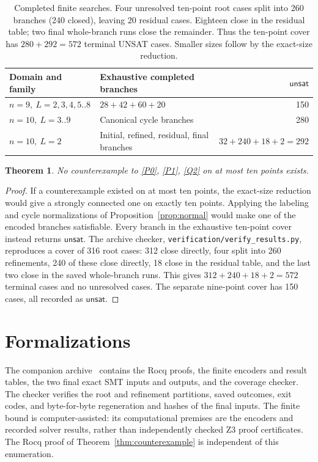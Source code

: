 \documentclass[11pt]{amsart}
\newcommand{\unsat}{\mathsf{unsat}}
\newtheorem{theorem}{Theorem}
\begin{document}
\begin{table}[t]
\centering
\small
\setlength{\tabcolsep}{4pt}
\begin{tabular}{@{}llr@{}}
\toprule
Domain and family & Exhaustive completed branches & \(\unsat\)\\
\midrule
\(n=9,\ L=2,3,4,5..8\) & \(28+42+60+20\) & 150\\
\(n=10,\ L=3..9\) & Canonical cycle branches & 280\\
\(n=10,\ L=2\) & Initial, refined, residual, final branches & \(32+240+18+2=292\)\\
\bottomrule
\end{tabular}
\caption{Completed finite searches. Four unresolved ten-point root cases split into 260 branches (240 closed), leaving 20 residual cases. Eighteen close in the residual table; two final whole-branch runs close the remainder. Thus the ten-point cover has \(280+292=572\) terminal UNSAT cases. Smaller sizes follow by the exact-size reduction.}
\label{tab:runs}
\end{table}

\begin{theorem}\label{thm:finite}
No counterexample to \eqref{P0}, \eqref{P1}, \eqref{Q2} on at most ten points exists.
\end{theorem}
\begin{proof}
If a counterexample existed on at most ten points, the exact-size reduction would give a strongly connected one on exactly ten points. Applying the labeling and cycle normalizations of Proposition~\ref{prop:normal} would make one of the encoded branches satisfiable. Every branch in the exhaustive ten-point cover instead returns \(\unsat\). The archive checker, \texttt{verification/verify\_results.py}, reproduces a cover of 316 root cases: 312 close directly, four split into 260 refinements, 240 of these close directly, 18 close in the residual table, and the last two close in the saved whole-branch runs. This gives \(312+240+18+2=572\) terminal cases and no unresolved cases. The separate nine-point cover has 150 cases, all recorded as \(\unsat\).
\end{proof}

\section{Formalizations}

The companion archive~\cite{archive} contains the Rocq proofs, the finite encoders and result tables, the two final exact SMT inputs and outputs, and the coverage checker. The checker verifies the root and refinement partitions, saved outcomes, exit codes, and byte-for-byte regeneration and hashes of the final inputs. The finite bound is computer-assisted: its computational premises are the encoders and recorded solver results, rather than independently checked Z3 proof certificates. The Rocq proof of Theorem~\ref{thm:counterexample} is independent of this enumeration.
\end{document}

